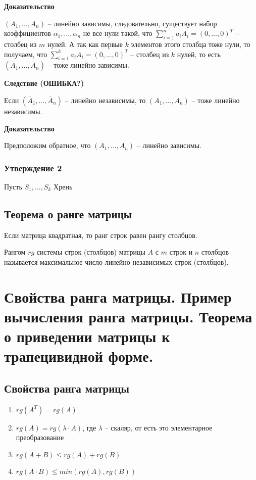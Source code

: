 \documentclass{article}
\begin{document}
\textbf{Доказательство}

$(A_1,\ldots,A_n)$ -- линейно зависимы, следовательно, существует набор коэффициентов $\alpha_1,\ldots,\alpha_n$ не все нули такой, что $\sum\limits_{i=1}^n a_i A_i=(0,\ldots,0)^T$ -- столбец из $m$ нулей. А так как первые $k$ элементов этого столбца тоже нули, то получаем, что $\sum\limits_{i=1}^k a_i A_i=(0,\ldots,0)^T$ -- столбец из $k$ нулей, то есть $(\overline{A}_1,\ldots,\overline{A}_n)$ -- тоже линейно зависимы.

\textbf{Следствие (ОШИБКА?)}

Если $(\overline{A}_1,\ldots,\overline{A}_n)$ -- линейно независимы, то $(A_1,\ldots,A_n)$ -- тоже линейно независимы.

\textbf{Доказательство}

Предположим обратное, что $(A_1,\ldots,A_n)$ -- линейно зависимы. 

\subsubsection{Утверждение 2}
Пусть $S_1,\ldots,S_k$
Хрень

\subsection{Теорема о ранге матрицы}
Если матрица квадратная, то ранг строк равен рангу столбцов.

Рангом $rg$ системы строк (столбцов) матрицы $A$ с $m$ строк и $n$ столбцов называется
максимальное число линейно независимых строк (столбцов).
\newpage
\section{Свойства ранга матрицы. Пример вычисления ранга матрицы. Теорема о приведении матрицы к трапецивидной форме.}
\subsection{Свойства ранга матрицы}
\begin{enumerate}
    \item $rg(A^T)=rg(A)$
    \item $rg(A)=rg(\lambda\cdot A)$, где $\lambda$ -- скаляр, от есть это элементарное преобразование
    \item $rg(A+B)\leqslant rg(A)+rg(B)$
    \item $rg(A\cdot B)\leqslant min(rg(A),rg(B))$
\end{enumerate}
\end{document}
